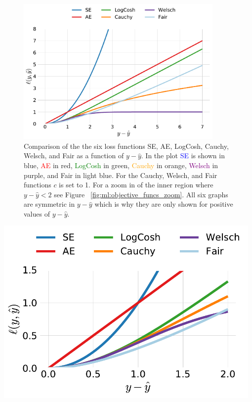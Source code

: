 \documentclass[a4paper, twoside, nobib]{tufte-book}
\newcommand{\figref}[1]{Figure ~\ref{#1}}
\begin{document}
\begin{figure}
  \includegraphics[width=0.9\textwidth]{figures/objective_functions/objective_functions.pdf}
  \caption[Comparison of different objective functions.]
    {Comparison of the the six loss functions SE, AE, LogCosh, Cauchy, Welsch, and Fair as a function of $y-\hat{y}$. In the plot \textcolor{blue}{SE} is shown in blue, \textcolor{red}{AE} in red, \textcolor{green}{LogCosh} in green, \textcolor{orange}{Cauchy} in orange, \textcolor{purple}{Welsch} in purple, and \textcolor{light-blue}{Fair} in light blue. For the Cauchy, Welsch, and Fair functions $c$ is set to 1. For a zoom in of the inner region 
    where $y-\hat{y}<2$ see \figref{fig:ml:objective_funcs_zoom}. All six graphs are symmetric in $y-\hat{y}$ which is why they are only shown for positive values of $y-\hat{y}$.
    }
  \label{fig:ml:objective_funcs}
\end{figure}

\begin{marginfigure}
  \includegraphics[width=0.98\textwidth]{figures/objective_functions/objective_functions_zoom.pdf}
  \caption[Comparison of different objective functions zoom in.]
    {Zoom in of \figref{fig:ml:objective_funcs}. 
    }
  \label{fig:ml:objective_funcs_zoom}
\end{marginfigure}
\end{document}
